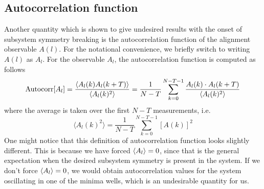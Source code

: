 \documentclass[../thesis_main.tex]{subfiles}
\begin{document}
\subsection{Autocorrelation function}
Another quantity which is shown to give undesired results with the onset of subsystem symmetry breaking is the autocorrelation function of the alignment observable $A(l)$. For the notational convenience, we briefly switch to writing $A(l)$ as $A_l$. For the observable $A_l$, the autocorrelation function is computed as follows
\begin{equation}
    \text{Autocorr}[A_l] = \frac{\expval{A_l(k) A_l(k+T)}}{\expval{A_l(k)^2}} = \frac{1}{N-T} \sum_{k=0}^{N-T-1} \frac{A_l(k) \cdot A_l(k+T)}{\expval{A_l(k)^2}}
\end{equation} 
where the average is taken over the first $N-T$ measurements, i.e.
\begin{equation}
    \langle{A_l(k)^2}\rangle = \frac{1}{N-T} \sum_{k=0}^{N-T-1} [A(k)]^2
\end{equation}
One might notice that this definition of autocorrelation function looks slightly different. This is because we have forced $\expval{A_l} = 0$, since that is the general expectation when the desired subsystem symmetry is present in the system. If we don't force $\expval{A_l} = 0$, we would obtain autocorrelation values for the system oscillating in one of the minima wells, which is an undesirable quantity for us.
\end{document}
